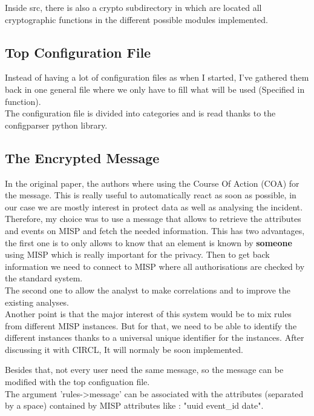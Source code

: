 \documentclass{eplmastersthesis}
\begin{document}
Inside src, there is also a crypto subdirectory in which are located all cryptographic functions in the different possible modules implemented.

\subsection{Top Configuration File}
Instead of having a lot of configuration files as when I started, I've gathered them back in one general file where we only have to fill what will be used (Specified in function).\\
The configuration file is divided into categories and is read thanks to the configparser python library.

\subsection{The Encrypted Message}
In the original paper, the authors where using the Course Of Action (COA) for the message. This is really useful to automatically react as soon as possible, in our case we are mostly interest in protect data as well as analysing the incident.\\
Therefore, my choice was to use a message that allows to retrieve the attributes and events on MISP and fetch the needed information. This has two advantages, the first one is to only allows to know that an element is known by \textbf{someone} using MISP which is really important for the privacy. Then to get back information we need to connect to MISP where all authorisations are checked by the standard system.\\
The second one to allow the analyst to make correlations and to improve the existing analyses.\\

Another point is that the major interest of this system would be to mix rules from different MISP instances. But for that, we need to be able to identify the different instances thanks to a universal unique identifier for the instances. After discussing it with CIRCL, It will normaly be soon implemented.\\

Besides that, not every user need the same message, so the message can be modified with the top configuation file.\\
The argument 'rules->message' can be associated with the attributes (separated by a space) contained by MISP attributes like : "uuid event\_id date".
\end{document}

